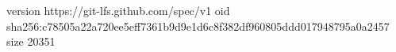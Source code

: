 version https://git-lfs.github.com/spec/v1
oid sha256:c78505a22a720ee5eff7361b9d9e1d6c8f382df960805ddd017948795a0a2457
size 20351
